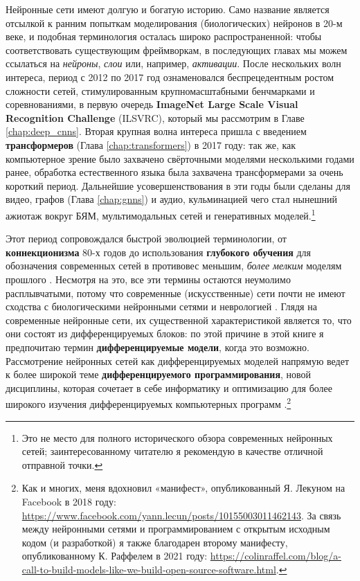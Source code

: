 Нейронные сети имеют долгую и богатую историю. Само название является отсылкой к ранним попыткам моделирования (биологических) нейронов в 20-м веке, и подобная терминология осталась широко распространенной: чтобы соответствовать существующим фреймворкам, в последующих главах мы можем ссылаться на \textit{нейроны}, \textit{слои} или, например, \textit{активации}. После нескольких волн интереса, период с 2012 по 2017 год ознаменовался беспрецедентным ростом сложности сетей, стимулированным крупномасштабными бенчмарками и соревнованиями, в первую очередь \textbf{ImageNet Large Scale Visual Recognition Challenge} (ILSVRC), который мы рассмотрим в Главе \ref{chap:deep_cnns}. Вторая крупная волна интереса пришла с введением \textbf{трансформеров} (Глава \ref{chap:transformers}) в 2017 году: так же, как компьютерное зрение было захвачено свёрточными моделями несколькими годами ранее, обработка естественного языка была захвачена трансформерами за очень короткий период. Дальнейшие усовершенствования в эти годы были сделаны для видео, графов (Глава \ref{chap:gnns}) и аудио, кульминацией чего стал нынешний ажиотаж вокруг БЯМ, мультимодальных сетей и генеративных моделей.\footnote{Это не место для полного исторического обзора современных нейронных сетей; заинтересованному читателю я рекомендую \cite{metz2022genius} в качестве отличной отправной точки.}

Этот период сопровождался быстрой эволюцией терминологии, от \textbf{коннекционизма} 80-х годов \cite{rumelhart1986general} до использования \textbf{глубокого обучения} для обозначения современных сетей в противовес меньшим, \textit{более мелким} моделям прошлого \cite{bengio2009learning,lecun2015deep}. Несмотря на это, все эти термины остаются неумолимо расплывчатыми, потому что современные (искусственные) сети почти не имеют сходства с биологическими нейронными сетями и неврологией \cite{zador2023catalyzing}. Глядя на современные нейронные сети, их существенной характеристикой является то, что они состоят из дифференцируемых блоков: по этой причине в этой книге я предпочитаю термин \textbf{дифференцируемые модели}, когда это возможно. Рассмотрение нейронных сетей как дифференцируемых моделей напрямую ведет к более широкой теме \textbf{дифференцируемого программирования}, новой дисциплины, которая сочетает в себе информатику и оптимизацию для более широкого изучения дифференцируемых компьютерных программ \cite{blondel2024elements}.\footnote{Как и многих, меня вдохновил «манифест», опубликованный Я. Лекуном на Facebook в 2018 году: \url{https://www.facebook.com/yann.lecun/posts/10155003011462143}. За связь между нейронными сетями и программированием с открытым исходным кодом (и разработкой) я также благодарен второму манифесту, опубликованному К. Раффелем в 2021 году: {\url{https://colinraffel.com/blog/a-call-to-build-models-like-we-build-open-source-software.html}}.}

